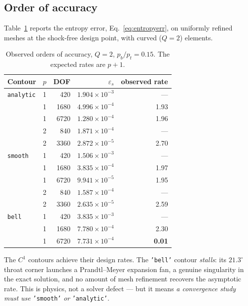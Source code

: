 \documentclass[11pt,a4paper]{article}
\newcommand{\code}[1]{\texttt{#1}}
\begin{document}
\subsection{Order of accuracy}

Table~\ref{tab:rates} reports the entropy error, Eq.~\eqref{eq:entropyerr}, on
uniformly refined meshes at the shock-free design point, with curved ($Q = 2$)
elements.

\begin{table}[H]
  \centering
  \small
  \begin{tabular}{llrrr}
    \toprule
    Contour & $p$ & DOF & $\varepsilon_s$ & observed rate \\
    \midrule
    \code{analytic} & 1 &  420 & $1.904\times10^{-3}$ & --- \\
                    & 1 & 1680 & $4.996\times10^{-4}$ & 1.93 \\
                    & 1 & 6720 & $1.280\times10^{-4}$ & 1.96 \\
                    & 2 &  840 & $1.871\times10^{-4}$ & --- \\
                    & 2 & 3360 & $2.872\times10^{-5}$ & 2.70 \\
    \midrule
    \code{smooth}   & 1 &  420 & $1.506\times10^{-3}$ & --- \\
                    & 1 & 1680 & $3.835\times10^{-4}$ & 1.97 \\
                    & 1 & 6720 & $9.941\times10^{-5}$ & 1.95 \\
                    & 2 &  840 & $1.587\times10^{-4}$ & --- \\
                    & 2 & 3360 & $2.635\times10^{-5}$ & 2.59 \\
    \midrule
    \code{bell}     & 1 &  420 & $3.835\times10^{-3}$ & --- \\
                    & 1 & 1680 & $7.780\times10^{-4}$ & 2.30 \\
                    & 1 & 6720 & $7.731\times10^{-4}$ & \textbf{0.01} \\
    \bottomrule
  \end{tabular}
  \caption{Observed orders of accuracy, $Q = 2$, $p_b/p_t = 0.15$.  The expected
    rates are $p+1$.}
  \label{tab:rates}
\end{table}

The $C^1$ contours achieve their design rates.  The \code{'bell'} contour
\emph{stalls}: its $21.3^{\circ}$ throat corner launches a Prandtl--Meyer
expansion fan, a genuine singularity in the exact solution, and no amount of mesh
refinement recovers the asymptotic rate.  This is physics, not a solver defect
--- but it means \emph{a convergence study must use} \code{'smooth'} \emph{or}
\code{'analytic'}.
\end{document}
